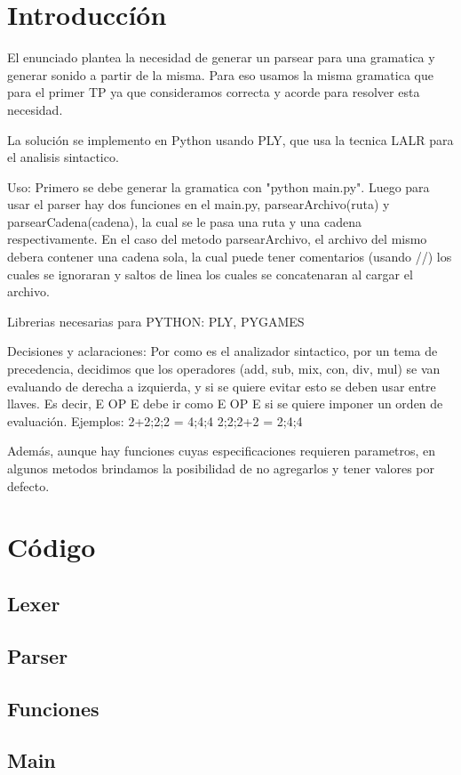 \documentclass[a4paper,titlepage,10pt]{article}
\begin{document}

\maketitle

\section{Introduccíón}


El enunciado plantea la necesidad de generar un parsear para una gramatica y generar sonido a partir de la misma. Para eso usamos la misma gramatica que para el primer TP ya que consideramos correcta y acorde para resolver esta necesidad.

La solución se implemento en Python usando PLY, que usa la tecnica LALR para el analisis sintactico.

Uso:
Primero se debe generar la gramatica con "python main.py". Luego para usar el parser hay dos funciones en el main.py, parsearArchivo(ruta) y parsearCadena(cadena), la cual se le pasa una ruta y una cadena respectivamente.
En el caso del metodo parsearArchivo, el archivo del mismo debera contener una cadena sola, la cual puede tener comentarios (usando //) los cuales se ignoraran y saltos de linea los cuales se concatenaran al cargar el archivo.


Librerias necesarias para PYTHON:
PLY, PYGAMES

Decisiones y aclaraciones:
Por como es el analizador sintactico, por un tema de precedencia, decidimos que los operadores (add, sub, mix, con, div, mul) se van evaluando de derecha a izquierda, y si se quiere evitar esto se deben usar entre llaves. 
Es decir, E OP E debe ir como {E OP E} si se quiere imponer un orden de evaluación.
Ejemplos: 
{{2}+{2;2};{2}} = {4;4;4}
{{2};{2;2}+{2}} = {2;4;4}


Además, aunque hay funciones cuyas especificaciones requieren parametros, en algunos metodos brindamos la posibilidad de no agregarlos y tener valores por defecto.


\section{Código}

\subsection{Lexer}


\subsection{Parser}


\subsection{Funciones}


\subsection{Main}

\end{document}

